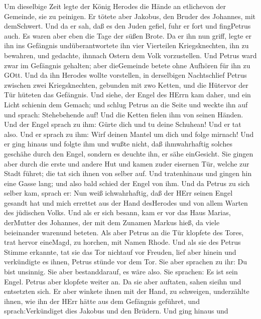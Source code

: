  Um dieselbige Zeit legte der König Herodes die Hände an
etlichevon der Gemeinde, sie zu peinigen.  Er tötete aber
Jakobus, den Bruder des Johannes, mit demSchwert.  Und da er
sah, daß es den Juden gefiel, fuhr er fort und fingPetrus auch. Es waren
aber eben die Tage der süßen Brote.  Da er ihn nun griff,
legte er ihn ins Gefängnis undüberantwortete ihn vier Vierteilen
Kriegsknechten, ihn zu bewahren, und gedachte, ihnnach Ostern dem Volk
vorzustellen.  Und Petrus ward zwar im Gefängnis gehalten;
aber dieGemeinde betete ohne Aufhören für ihn zu GOtt.  Und
da ihn Herodes wollte vorstellen, in derselbigen Nachtschlief Petrus
zwischen zwei Kriegsknechten, gebunden mit zwo Ketten, und die Hütervor
der Tür hüteten das Gefängnis.  Und siehe, der Engel des
HErrn kam daher, und ein Licht schienin dem Gemach; und schlug Petrus an
die Seite und weckte ihn auf und sprach: Stehebehende auf! Und die
Ketten fielen ihm von seinen Händen.  Und der Engel sprach
zu ihm: Gürte dich und tu deine Schuhean! Und er tat also. Und er sprach
zu ihm: Wirf deinen Mantel um dich und folge mirnach!  Und
er ging hinaus und folgte ihm und wußte nicht, daß ihmwahrhaftig solches
geschähe durch den Engel, sondern es deuchte ihn, er sähe einGesicht.
 Sie gingen aber durch die erste und andere Hut und kamen
zuder eisernen Tür, welche zur Stadt führet; die tat sich ihnen von
selber auf. Und tratenhinaus und gingen hin eine Gasse lang; und also
bald schied der Engel von ihm.  Und da Petrus zu sich
selber kam, sprach er: Nun weiß ichwahrhaftig, daß der HErr seinen Engel
gesandt hat und mich errettet aus der Hand desHerodes und von allem
Warten des jüdischen Volks.  Und als er sich besann, kam er
vor das Haus Marias, derMutter des Johannes, der mit dem Zunamen Markus
hieß, da viele beieinander warenund beteten.  Als aber
Petrus an die Tür klopfete des Tores, trat hervor eineMagd, zu horchen,
mit Namen Rhode.  Und als sie des Petrus Stimme erkannte,
tat sie das Tor nichtauf vor Freuden, lief aber hinein und verkündigte
es ihnen, Petrus stünde vor dem Tor.  Sie aber sprachen zu
ihr: Du bist unsinnig. Sie aber bestanddarauf, es wäre also. Sie
sprachen: Es ist sein Engel.  Petrus aber klopfete weiter
an. Da sie aber auftaten, sahen sieihn und entsetzten sich.
 Er aber winkete ihnen mit der Hand, zu schweigen,
underzählte ihnen, wie ihn der HErr hätte aus dem Gefängnis geführet,
und sprach:Verkündiget dies Jakobus und den Brüdern. Und ging hinaus und
